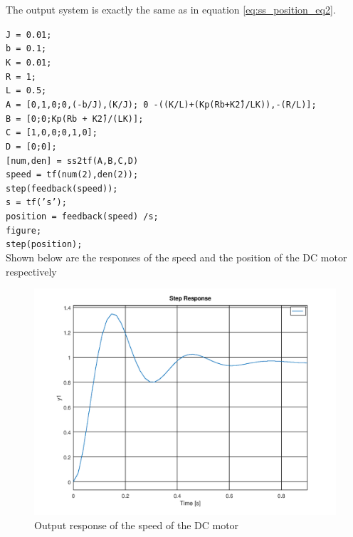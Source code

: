 \documentclass[a4paper, 12pt]{article}
\begin{document}
The output system is exactly the same as in equation \eqref{eq:ss_position_eq2}.

\noindent
\texttt{J = 0.01;}\\
\texttt{b = 0.1;}\\
\texttt{K = 0.01;}\\
\texttt{R = 1;}\\
\texttt{L = 0.5;}\\
\texttt{A = [0,1,0;0,(-b/J),(K/J); 0 -((K/L)+(Kp\*(R\*b+K\^2)/L\*K)),-(R/L)];}\\
\texttt{B = [0;0;Kp\*(R\*b + K\^2)/(L\*K)];}\\
\texttt{C = [1,0,0;0,1,0];}\\
\texttt{D = [0;0];}\\
\texttt{[num,den] = ss2tf(A,B,C,D)}\\
\texttt{speed = tf(num(2),den(2));}\\
\texttt{step(feedback(speed));}\\
\texttt{s = tf('s');}\\
\texttt{position = feedback(speed) /s;}\\
\texttt{figure;}\\
\texttt{step(position);}\\

Shown below are the responses of the speed and the position of the DC motor respectively

\begin{figure}[H]
	\centering
	\includegraphics[width=\textwidth]{Images/question_3_speed.png}
	\caption{Output response of the speed of the DC motor}
	\label{fig:question_3_speed}
\end{figure}
\end{document}
